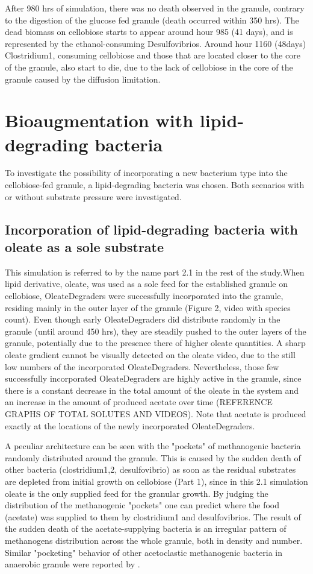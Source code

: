 After 980 hrs of simulation, there was no death observed in the granule, contrary to the digestion of the glucose fed granule (death occurred within 350 hrs). The dead biomass on cellobiose starts to appear around hour 985 (41 days), and is represented by the ethanol-consuming Desulfovibrios. Around hour 1160 (48days) Clostridium1, consuming cellobiose and those that are located closer to the core of the granule, also start to die, due to the lack of cellobiose in the core of the granule caused by the diffusion limitation. 

\section{Bioaugmentation with lipid-degrading bacteria}

To investigate the possibility of incorporating a new bacterium type into the cellobiose-fed granule, a lipid-degrading bacteria was chosen. Both scenarios with or without substrate pressure were investigated.

\subsection{Incorporation of lipid-degrading bacteria with oleate as a sole substrate}

This simulation is referred to by the name part 2.1 in the rest of the study.When lipid derivative, oleate, was used as a sole feed for the established granule on cellobiose, OleateDegraders were successfully incorporated into the granule, residing mainly in the outer layer of the granule (Figure 2, video with species count). Even though early OleateDegraders did distribute randomly in the granule (until around 450 hrs), they are steadily pushed to the outer layers of the granule, potentially due to the presence there of higher oleate quantities. A sharp oleate gradient cannot be visually detected on the oleate video, due to the still low numbers of the incorporated OleateDegraders. Nevertheless, those few successfully incorporated OleateDegraders are highly active in the granule, since there is a constant decrease in the total amount of the oleate in the system and an increase in the amount of produced acetate over time (REFERENCE GRAPHS OF TOTAL SOLUTES AND VIDEOS). Note that acetate is produced exactly at the locations of the newly incorporated OleateDegraders.

A peculiar architecture can be seen with the "pockets" of methanogenic bacteria randomly distributed around the granule. This is caused by the sudden death of other bacteria (clostridium1,2, desulfovibrio) as soon as the residual substrates are depleted from initial growth on cellobiose (Part 1), since in this 2.1 simulation oleate is the only supplied feed for the granular growth. By judging the distribution of the methanogenic "pockets" one can predict where the food (acetate) was supplied to them by clostridium1 and desulfovibrios. The result of the sudden death of the acetate-supplying bacteria is an irregular pattern of methanogens distribution across the whole granule, both in density and number. Similar "pocketing" behavior of other acetoclastic methanogenic bacteria in anaerobic granule were reported by \cite{schmidt1999immobilization}. 

